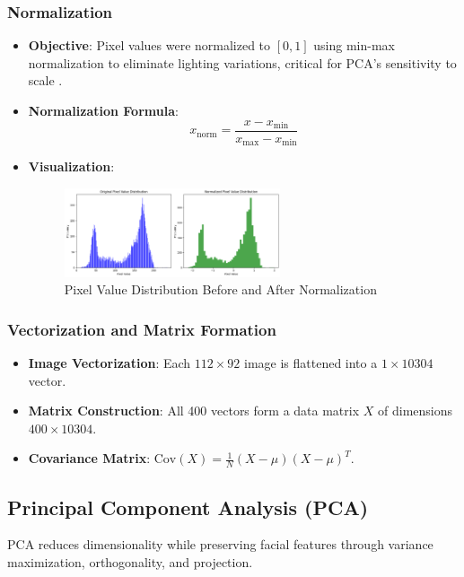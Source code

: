 \documentclass{article}
\begin{document}
	\subsubsection{Normalization}
	\begin{itemize}
		\item \textbf{Objective}: Pixel values were normalized to \([0, 1]\) using min-max normalization to eliminate lighting variations, critical for PCA’s sensitivity to scale \citep{kanan2012grayscale}.
		\item \textbf{Normalization Formula}:
		\[
		x_{\text{norm}} = \frac{x - x_{\text{min}}}{x_{\text{max}} - x_{\text{min}}}
		\]
		\item \textbf{Visualization}:
		\begin{figure}[h]
			\centering
			\includegraphics[width=0.6\textwidth]{Normalized Pixel Value Distribution.png}
			\caption{Pixel Value Distribution Before and After Normalization}
			\label{fig:normalization_comparison}
		\end{figure}
	\end{itemize}
	
	\subsubsection{Vectorization and Matrix Formation}
	\begin{itemize}
		\item \textbf{Image Vectorization}: Each \(112 \times 92\) image is flattened into a \(1 \times 10304\) vector.
		\item \textbf{Matrix Construction}: All 400 vectors form a data matrix \(X\) of dimensions \(400 \times 10304\).
		\item \textbf{Covariance Matrix}: \(\text{Cov}(X) = \frac{1}{N} (X - \mu)(X - \mu)^T\).
	\end{itemize}
	
	\subsection{Principal Component Analysis (PCA)}
	PCA reduces dimensionality while preserving facial features through variance maximization, orthogonality, and projection.
	
\end{document}
